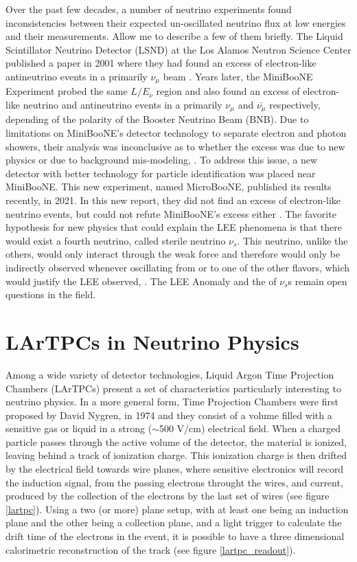 Over the past few decades, a number of neutrino experiments found inconsistencies between their expected un-oscillated neutrino flux at low energies and their measurements. Allow me to describe a few of them briefly. The Liquid Scintillator Neutrino Detector (LSND) at the Los Alamos Neutron Science Center published a paper in 2001 where they had found an excess of electron-like antineutrino events in a primarily $\nu_{\mu}$ beam \cite{lsnd}. Years later, the MiniBooNE Experiment probed the same $L/E_{\nu}$ region and also found an excess of electron-like neutrino and antineutrino events in a primarily $\nu_{\mu}$ and $\bar{\nu_{\mu}}$ respectively, depending of the polarity of the Booster Neutrino Beam (BNB). Due to limitations on MiniBooNE's detector technology to separate electron and photon showers, their analysis was inconclusive as to whether the excess was due to new physics or due to background mis-modeling, \cite{miniboone}. To address this issue, a new detector with better technology for particle identification was placed near MiniBooNE. This new experiment, named MicroBooNE, published its results recently, in 2021. In this new report, they did not find an excess of electron-like neutrino events, but could not refute MiniBooNE's excess either \cite{microboone_lee}. The favorite hypothesis for new physics that could explain the LEE phenomena is that there would exist a fourth neutrino, called sterile neutrino $\nu_s$. This neutrino, unlike the others, would only interact through the weak force and therefore would only be indirectly observed whenever oscillating from or to one of the other flavors, which would justify the LEE observed, \cite{Lauren_thesis}. 
The LEE Anomaly and the of $\nu_s$s remain open questions in the field. 

\section{LArTPCs in Neutrino Physics}
Among a wide variety of detector technologies, Liquid Argon Time Projection Chambers (LArTPCs) present a set of characteristics particularly interesting to neutrino physics. 
In a more general form, Time Projection Chambers were first proposed by David Nygren, in 1974 \cite{Nygren} and they consist of a volume filled with a sensitive gas or liquid in a strong ($\sim$500 V/cm) electrical field. When a charged particle passes through the active volume of the detector, the material is ionized, leaving behind a track of ionization charge. This ionization charge is then drifted by the electrical field towards wire planes, where sensitive electronics will record the induction signal, from the passing electrons throught the wires, and current, produced by the collection of the electrons by the last set of wires (see figure \ref{lartpc}). Using a two (or more) plane setup, with at least one being an induction plane and the other being a collection plane, and a light trigger to calculate the drift time of the electrons in the event, it is possible to have a three dimensional calorimetric reconstruction of the track (see figure \ref{lartpc_readout}).

